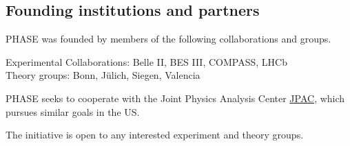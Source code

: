 \subsection{Founding institutions and partners}
PHASE was founded by members of the following collaborations and groups.

Experimental Collaborations: Belle II, BES III, COMPASS, LHCb \\
Theory groups: Bonn, J\"ulich, Siegen, Valencia

PHASE seeks to cooperate with the Joint Physics Analysis Center \href{https://jpac.jlab.org/}{JPAC}, which pursues similar goals in the US.

The initiative is open to any interested experiment and theory groups.
